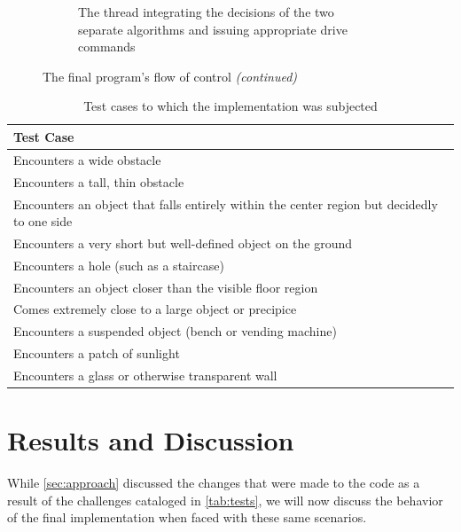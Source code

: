 \documentclass[12pt]{report}
\begin{document}
\begin{figure}
\begin{subfigure}{\textwidth}
\caption[Integration and drive control]{The thread integrating the decisions of the two separate algorithms and issuing appropriate drive commands}
\end{subfigure}
\captionsetup{list=false}
\caption{The final program's flow of control \textit{(continued)}}
\label{fig:runtimecont}
\end{figure}

\begin{table}[h]
\caption[Test cases]{Test cases to which the implementation was subjected}
\label{tab:tests}
\begin{tabular}{| p{\textwidth} |}
\hline
\textbf{Test Case} \\
\hline\hline
Encounters a wide obstacle \\
\hline
Encounters a tall, thin obstacle \\
\hline
Encounters an object that falls entirely within the center region but decidedly to one side \\
\hline
Encounters a very short but well-defined object on the ground \\
\hline
Encounters a hole (such as a staircase) \\
\hline
Encounters an object closer than the visible floor region \\
\hline
Comes extremely close to a large object or precipice \\
\hline
Encounters a suspended object (bench or vending machine) \\
\hline
Encounters a patch of sunlight \\
\hline
Encounters a glass or otherwise transparent wall \\
\hline
\end{tabular}
\end{table}

\section{Results and Discussion}
While \autoref{sec:approach} discussed the changes that were made to the code as a result of the challenges cataloged in \autoref{tab:tests}, we will now discuss the behavior of the final implementation when faced with these same scenarios.
\end{document}

